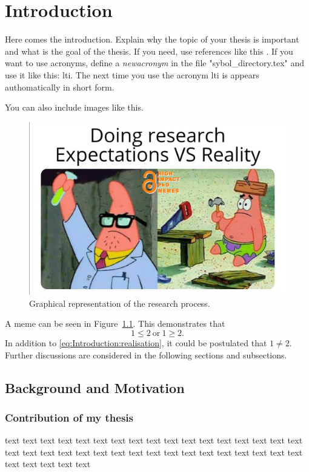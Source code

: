\chapter{Introduction} \label{ch:Introduction}

Here comes the introduction. Explain why the topic of your thesis is important and what is the goal of the thesis. If you need, use references like this \cite{higham2020handbook}. If you want to use acronyms, define a \textit{newacronym} in the file "sybol\_directory.tex" and use it like this: \gls{lti}. The next time you use the acronym \gls{lti} is appears authomatically in short form.  

You can also include images like this.

\begin{figure}[ht!]
    \centering
    \includegraphics[width=\textwidth]{03_images/meme.png}
    \caption{Graphical representation of the research process.}
    \label{fig:Introduction:meme}
\end{figure}


A meme can be seen in Figure~\ref*{fig:Introduction:meme}. This demonstrates that 
\begin{equation} \label{eq:Introduction:realisation}
	1 \le 2 \ \text{or} \ 1 \ge 2.
\end{equation}
In addition to \eqref{eq:Introduction:realisation}, it could be postulated that $1 \ne 2$. Further discussions are considered in the following sections and subsections.

\section{Background and Motivation} \label{sec:Introduction:Background}

\subsection{Contribution of my thesis}

text text text text text text text text text text text text text text text text text text text text text text text text text text text text text text text text text text text text text text text 